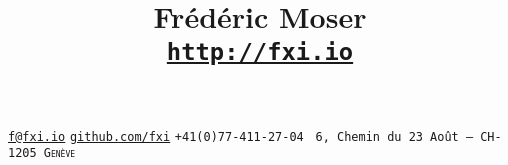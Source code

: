 \documentclass[10pt]{article}
\title{Frédéric Moser \\ {\small \href{http://fxi.io}{\tt http://fxi.io}}}
\makeatletter
\def\maketitle{%
  \begin{center}
    {\Large\sffamily\bfseries \@title}%
  \end{center}%
  \vspace{3ex}
}
\makeatother
\begin{document}
\maketitle



{\small
  \faPencil \hspace{0.2em} \href{mailto:f@fxi.io?Subject=Job}{\tt f@fxi.io}\hfill
  \faGithub \hspace{0.2em} \href{https://github.com/fxi}{\tt github.com/fxi}\hfill
  \faPhone  \hspace{0.2em} {\tt +41(0)77-411-27-04 \hfill}
  \faHome  \hspace{0.2em} {\tt 6, Chemin du 23 Août -- CH-1205 \textsc{Genève}}
}

%
\end{document}
